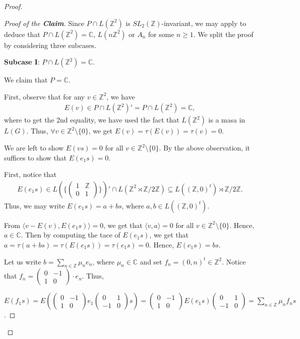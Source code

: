 \documentclass[12pt]{amsart}
\theoremstyle{definition}
\theoremstyle{remark}
\begin{document}
\begin{proof}
\begin{proof}[Proof of the \textbf{Claim}]
Since $P\cap L(\mathbb{Z}^2)$ is $SL_2(\mathbb{Z})$-invariant, we may apply \cite[Example 5.9]{wit} to deduce that $P\cap L(\mathbb{Z}^2)=\mathbb{C}$, $L(n\mathbb{Z}^2)$ or $A_n$ for some $n\geq 1$. We split the proof by considering three subcases.

\textbf{Subcase I}: $P\cap L(\mathbb{Z}^2)=\mathbb{C}$.

We claim that $P=\mathbb{C}$.


First, observe that for any $v\in \mathbb{Z}^2$, we have 
\begin{align*}
E(v)\in P\cap L(\mathbb{Z}^2)'=P\cap L(\mathbb{Z}^2)=\mathbb{C},
\end{align*}
where to get the 2nd equality, we have used the fact that $L(\mathbb{Z}^2)$ is a masa in $L(G)$.
Thus, $\forall v\in \mathbb{Z}^2\setminus \{0\}$, we get $E(v)=\tau(E(v))=\tau(v)=0$.

We are left to show $E(vs)=0$ for all $v\in\mathbb{Z}^2\setminus \{0\}$. By the above observation, it suffices to show that $E(e_1s)=0$. 

First, notice that
\begin{align*}
E(e_1s)\in L(\{\begin{pmatrix}
1&\mathbb{Z}\\
0&1
\end{pmatrix} \})'\cap L(\mathbb{Z}^2\rtimes \mathbb{Z}/{2\mathbb{Z}})\subseteq L((\mathbb{Z}, 0)^t)\rtimes \mathbb{Z}/{2\mathbb{Z}}.
\end{align*}
Thus, we may write $E(e_1s)=a+bs$, where $a, b\in L((\mathbb{Z}, 0)^t)$.

From $\langle v-E(v), E(e_1s)\rangle=0$, we get that $\langle v, a \rangle=0$ for all $v\in\mathbb{Z}^2\setminus \{0\}$. Hence, $a\in\mathbb{C}$. Then by computing the tace of $E(e_1s)$, we get that $a=\tau(a+bs)=\tau(E(e_1s))=\tau(e_1s)=0$. Hence, $E(e_1s)=bs$. 

Let us write $b=\sum_{n\in\mathbb{Z}}\mu_ne_n$, where $\mu_n\in\mathbb{C}$ and set $f_n=(0, n)^t\in\mathbb{Z}^2$. 
Notice that $f_n=\begin{pmatrix}
0&-1\\
1&0
\end{pmatrix}\cdot e_n$. Thus,

$E(f_1s)=E(\begin{pmatrix}
0&-1\\
1&0
\end{pmatrix}e_1\begin{pmatrix}
0&1\\
-1&0
\end{pmatrix}s)=\begin{pmatrix}
0&-1\\
1&0
\end{pmatrix} E(e_1s)\begin{pmatrix}
0&1\\
-1&0
\end{pmatrix}=\sum_{n\in\mathbb{Z}}\mu_n f_ns$. 


\end{proof}
\end{proof}
\end{document}
